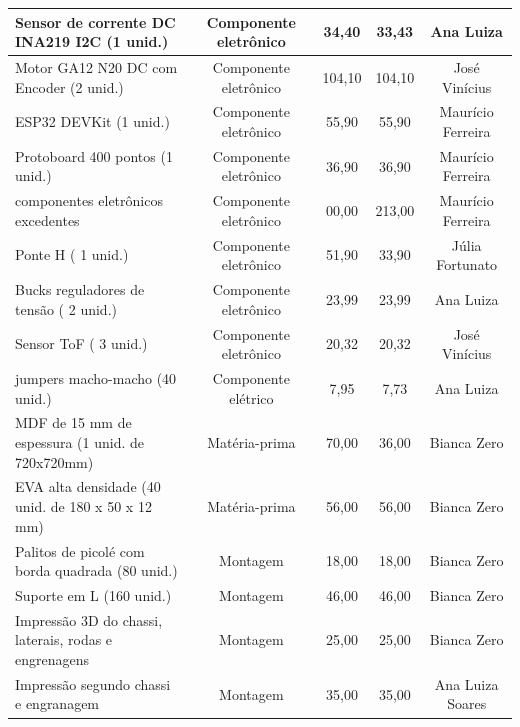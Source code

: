 \begin{landscape}
\begin{table}[htpb]
\begin{center}
\begin{tabular}{|l|c|c|c|c|}
Sensor de corrente DC INA219 I2C (1 unid.)
& Componente eletrônico & 34,40 & 33,43 & Ana Luiza \\ \hline

Motor GA12 N20 DC com Encoder (2 unid.)
& Componente eletrônico & 104,10 & 104,10 & José Vinícius \\ \hline

ESP32 DEVKit (1 unid.)
& Componente eletrônico & 55,90 & 55,90 & Maurício Ferreira \\ \hline

Protoboard 400 pontos (1 unid.)
& Componente eletrônico & 36,90 & 36,90 & Maurício Ferreira \\ \hline

componentes eletrônicos excedentes
& Componente eletrônico & 00,00 & 213,00 & Maurício Ferreira \\ \hline

Ponte H ( 1 unid.)
& Componente eletrônico & 51,90 & 33,90 & Júlia Fortunato \\ \hline

Bucks reguladores de tensão ( 2 unid.)
& Componente eletrônico & 23,99 & 23,99 & Ana Luiza \\ \hline

Sensor ToF ( 3 unid.)
& Componente eletrônico & 20,32 & 20,32 & José Vinícius \\ \hline

jumpers macho-macho (40 unid.)
& Componente elétrico & 7,95 & 7,73 & Ana Luiza \\ \hline

MDF de 15 mm de espessura (1 unid. de 720x720mm) & Matéria-prima & 70,00 & 36,00 & Bianca Zero \\ \hline

EVA alta densidade (40 unid. de 180 x 50 x 12 mm) & Matéria-prima & 56,00 & 56,00 & Bianca Zero \\ \hline

Palitos de picolé com borda quadrada (80 unid.) & Montagem & 18,00 & 18,00 & Bianca Zero \\ \hline

Suporte em L (160 unid.) & Montagem & 46,00 & 46,00 & Bianca Zero \\ \hline

Impressão 3D do chassi, laterais, rodas e engrenagens & Montagem & 25,00 & 25,00 & Bianca Zero \\ \hline

Impressão segundo chassi e engranagem & Montagem & 35,00 & 35,00 & Ana Luiza Soares \\ \hline


\end{tabular}
\end{center}
\end{table}
\end{landscape}
